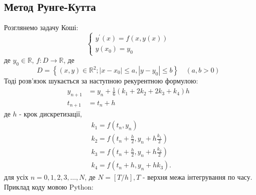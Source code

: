 \documentclass[a4paper,12pt]{extreport}
\begin{document}
\subsection*{Метод Рунге-Кутта}
    Розглянемо задачу Коші:
    $$
    \left\{\begin{array}{l}
    y^{\prime}(x)=f(x, y(x)) \\
    y\left(x_0\right)=y_0
    \end{array}\right.
    $$
    де $y_0 \in \mathbb{R}$, $f: D \rightarrow \mathbb{R}$, де 
    $$
    D=\left\{(x, y) \in \mathbb{R}^2 ;\left|x-x_0\right| \leq a,\left|y-y_0\right| \leq b\right\} \quad(a, b>0)
    $$
    Тоді розв'язок шукається за наступною рекурентною формулою:
    $$
    \begin{aligned}
    y_{n+1} &=y_n+\frac{1}{6}\left(k_1+2 k_2+2 k_3+k_4\right) h \\
    t_{n+1} &=t_n+h
    \end{aligned}
    $$
    де $h$ - крок дискретизації,
    $$
    \begin{aligned}
    &k_1=f\left(t_n, y_n\right) \\
    &k_2=f\left(t_n+\frac{h}{2}, y_n+h \frac{k_1}{2}\right) \\
    &k_3=f\left(t_n+\frac{h}{2}, y_n+h \frac{k_2}{2}\right) \\
    &k_4=f\left(t_n+h, y_n+h k_3\right) .
    \end{aligned}
    $$
    для усіх $n=0,1,2,3, \ldots, N$, де $N = [T/h], T$  - верхня межа інтегрування по часу.
    \newpage
    Приклад коду мовою Python:
\end{document}
